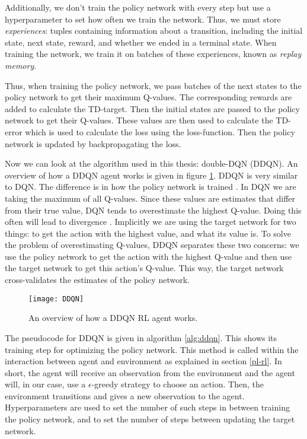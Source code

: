 Additionally, we don't train the policy network with every step but use a hyperparameter to set how often we train the network. Thus, we must store \emph{experiences}: tuples containing information about a transition, including the initial state, next state, reward, and whether we ended in a terminal state. When training the network, we train it on batches of these experiences, known as \emph{replay memory}. 

Thus, when training the policy network, we pass batches of the next states to the policy network to get their maximum Q-values. The corresponding rewards are added to calculate the TD-target. Then the initial states are passed to the policy network to get their Q-values. These values are then used to calculate the TD-error which is used to calculate the loss using the loss-function. Then the policy network is updated by backpropagating the loss.

Now we can look at the algorithm used in this thesis: double-DQN (DDQN). An overview of how a DDQN agent works is given in figure \ref{fig:ddqn}. DDQN is very similar to DQN. The difference is in how the policy network is trained \cite{ddqn}. In DQN we are taking the maximum of all Q-values. Since these values are estimates that differ from their true value, DQN tends to overestimate the highest Q-value. Doing this often will lead to divergence \cite[p. 293-297]{grokking}. Implicitly we are using the target network for two things: to get the action with the highest value, and what its value is. To solve the problem of overestimating Q-values, DDQN separates these two concerns: we use the policy network to get the action with the highest Q-value and then use the target network to get this action's Q-value. This way, the target network cross-validates the estimates of the policy network.

\begin{figure}[h]
    \centering
    \texttt{[image: DDQN]}
    \caption{An overview of how a DDQN RL agent works.}
    \label{fig:ddqn}
\end{figure}

The pseudocode for DDQN is given in algorithm \ref{alg:ddqn}. This shows its training step for optimizing the policy network. This method is called within the interaction between agent and environment as explained in section \ref{pl-rl}. In short, the agent will receive an observation from the environment and the agent will, in our case, use a {$\epsilon$}-greedy strategy to choose an action. Then, the environment transitions and gives a new observation to the agent. Hyperparameters are used to set the number of such steps in between training the policy network, and to set the number of steps between updating the target network.

